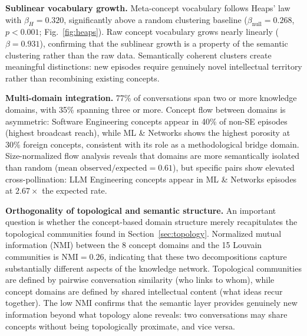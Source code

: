 \documentclass[journal]{IEEEtran}
\begin{document}
\textbf{Sublinear vocabulary growth.}
Meta-concept vocabulary follows Heaps' law~\cite{heaps1978information}
with $\beta_H = 0.320$, significantly above a random clustering baseline
($\beta_\text{null} = 0.268$, $p < 0.001$; Fig.~\ref{fig:heaps}).
Raw concept vocabulary grows nearly linearly ($\beta = 0.931$),
confirming that the sublinear growth is a property of the semantic
clustering rather than the raw data.  Semantically coherent clusters
create meaningful distinctions: new episodes require genuinely novel
intellectual territory rather than recombining existing concepts.

\textbf{Multi-domain integration.}
77\% of conversations span two or more knowledge domains, with 35\%
spanning three or more.  Concept flow between domains is asymmetric:
Software Engineering concepts appear in 40\% of non-SE episodes
(highest broadcast reach), while ML \& Networks shows the highest
porosity at 30\% foreign concepts, consistent with its role as a
methodological bridge domain.  Size-normalized flow analysis reveals
that domains are more semantically isolated than random ($\text{mean
observed/expected} = 0.61$), but specific pairs show elevated
cross-pollination: LLM Engineering concepts appear in ML \& Networks
episodes at $2.67\times$ the expected rate.

\textbf{Orthogonality of topological and semantic structure.}
An important question is whether the concept-based domain structure
merely recapitulates the topological communities found in
Section~\ref{sec:topology}.  Normalized mutual information (NMI)
between the 8 concept domains and the 15 Louvain communities is
$\text{NMI} = 0.26$, indicating that these two decompositions capture
substantially different aspects of the knowledge network.  Topological
communities are defined by pairwise conversation similarity (who links
to whom), while concept domains are defined by shared intellectual
content (what ideas recur together).  The low NMI confirms that the
semantic layer provides genuinely new information beyond what topology
alone reveals: two conversations may share concepts without being
topologically proximate, and vice versa.
\end{document}
